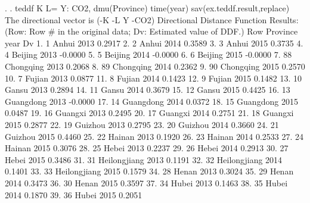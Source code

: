 . 
. teddf K L= Y: CO2, dmu(Province) time(year) sav(ex.teddf.result,replace)
{\smallskip}
 The directional vector is (-K -L Y -CO2)
{\smallskip}
{\smallskip}
  Directional Distance Function Results:
    (Row: Row \# in the original data; Dv: Estimated value of  DDF.)
{\smallskip}
     {\TLC}
     {\VBAR} Row       Province   year        Dv {\VBAR}
     {\LFTT}
  1. {\VBAR}   1          Anhui   2013    0.2917 {\VBAR}
  2. {\VBAR}   2          Anhui   2014    0.3589 {\VBAR}
  3. {\VBAR}   3          Anhui   2015    0.3735 {\VBAR}
  4. {\VBAR}   4        Beijing   2013   -0.0000 {\VBAR}
  5. {\VBAR}   5        Beijing   2014   -0.0000 {\VBAR}
  6. {\VBAR}   6        Beijing   2015   -0.0000 {\VBAR}
  7. {\VBAR}  88      Chongqing   2013    0.2068 {\VBAR}
  8. {\VBAR}  89      Chongqing   2014    0.2362 {\VBAR}
  9. {\VBAR}  90      Chongqing   2015    0.2570 {\VBAR}
 10. {\VBAR}   7         Fujian   2013    0.0877 {\VBAR}
 11. {\VBAR}   8         Fujian   2014    0.1423 {\VBAR}
 12. {\VBAR}   9         Fujian   2015    0.1482 {\VBAR}
 13. {\VBAR}  10          Gansu   2013    0.2894 {\VBAR}
 14. {\VBAR}  11          Gansu   2014    0.3679 {\VBAR}
 15. {\VBAR}  12          Gansu   2015    0.4425 {\VBAR}
 16. {\VBAR}  13      Guangdong   2013   -0.0000 {\VBAR}
 17. {\VBAR}  14      Guangdong   2014    0.0372 {\VBAR}
 18. {\VBAR}  15      Guangdong   2015    0.0487 {\VBAR}
 19. {\VBAR}  16        Guangxi   2013    0.2495 {\VBAR}
 20. {\VBAR}  17        Guangxi   2014    0.2751 {\VBAR}
 21. {\VBAR}  18        Guangxi   2015    0.2877 {\VBAR}
 22. {\VBAR}  19        Guizhou   2013    0.2795 {\VBAR}
 23. {\VBAR}  20        Guizhou   2014    0.3660 {\VBAR}
 24. {\VBAR}  21        Guizhou   2015    0.4460 {\VBAR}
 25. {\VBAR}  22         Hainan   2013    0.1920 {\VBAR}
 26. {\VBAR}  23         Hainan   2014    0.2533 {\VBAR}
 27. {\VBAR}  24         Hainan   2015    0.3076 {\VBAR}
 28. {\VBAR}  25          Hebei   2013    0.2237 {\VBAR}
 29. {\VBAR}  26          Hebei   2014    0.2913 {\VBAR}
 30. {\VBAR}  27          Hebei   2015    0.3486 {\VBAR}
 31. {\VBAR}  31   Heilongjiang   2013    0.1191 {\VBAR}
 32. {\VBAR}  32   Heilongjiang   2014    0.1401 {\VBAR}
 33. {\VBAR}  33   Heilongjiang   2015    0.1579 {\VBAR}
 34. {\VBAR}  28          Henan   2013    0.3024 {\VBAR}
 35. {\VBAR}  29          Henan   2014    0.3473 {\VBAR}
 36. {\VBAR}  30          Henan   2015    0.3597 {\VBAR}
 37. {\VBAR}  34          Hubei   2013    0.1463 {\VBAR}
 38. {\VBAR}  35          Hubei   2014    0.1870 {\VBAR}
 39. {\VBAR}  36          Hubei   2015    0.2051 {\VBAR}
